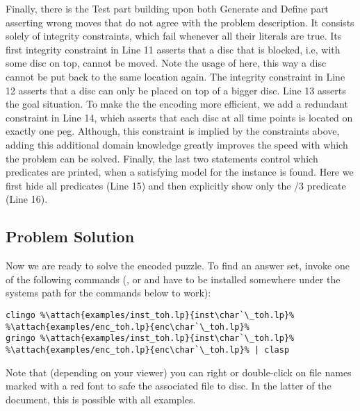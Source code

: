 Finally, there is the Test part building upon both Generate and Define part 
asserting wrong moves that do not agree with the problem description.
It consists solely of integrity constraints, which fail whenever all their literals are true.
Its first integrity constraint in Line 11 asserts 
that a disc that is blocked, i.e, with some disc on top, cannot be moved.
Note the usage of  here, this way a disc cannot be put back to the same location again.
The integrity constraint in Line 12 asserts that a disc can only be placed on top of a bigger disc.
Line 13 asserts the goal situation.
To make the the encoding more efficient, we add a redundant constraint in Line 14,
which asserts that each disc at all time points is located on exactly one peg.
Although, this constraint is implied by the constraints above,
adding this additional domain knowledge greatly improves the speed with which the problem can be solved.
Finally, the last two statements control which predicates are printed, when a satisfying model
for the instance is found.
Here we first hide all predicates (Line 15) and then explicitly show only the /$3$ predicate (Line 16).

\subsection{Problem Solution}

Now we are ready to solve the encoded puzzle. 
To find an answer set, invoke one of the following commands 
(\clingo{}, or \gringo{} and \clasp{} have to be installed somewhere under the systems path for the commands below to work):
\begin{lstlisting}[numbers=none,escapechar=\%]
clingo %\attach{examples/inst_toh.lp}{inst\char`\_toh.lp}% %\attach{examples/enc_toh.lp}{enc\char`\_toh.lp}%
gringo %\attach{examples/inst_toh.lp}{inst\char`\_toh.lp}% %\attach{examples/enc_toh.lp}{enc\char`\_toh.lp}% | clasp
\end{lstlisting}
Note that (depending on your viewer) you can right or double-click on file names marked with a red font 
to safe the associated file to disc.
In the latter of the document, this is possible with all examples.

